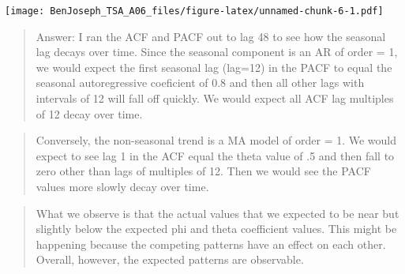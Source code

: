 \documentclass[
]{article}
\begin{document}
\texttt{[image: BenJoseph\_TSA\_A06\_files/figure-latex/unnamed-chunk-6-1.pdf]}

\begin{quote}
Answer: I ran the ACF and PACF out to lag 48 to see how the seasonal lag
decays over time. Since the seasonal component is an AR of order = 1, we
would expect the first seasonal lag (lag=12) in the PACF to equal the
seasonal autoregressive coeficient of 0.8 and then all other lags with
intervals of 12 will fall off quickly. We would expect all ACF lag
multiples of 12 decay over time.
\end{quote}

\begin{quote}
Conversely, the non-seasonal trend is a MA model of order = 1. We would
expect to see lag 1 in the ACF equal the theta value of .5 and then fall
to zero other than lags of multiples of 12. Then we would see the PACF
values more slowly decay over time.
\end{quote}

\begin{quote}
What we observe is that the actual values that we expected to be near
but slightly below the expected phi and theta coefficient values. This
might be happening because the competing patterns have an effect on each
other. Overall, however, the expected patterns are observable.
\end{quote}
\end{document}
